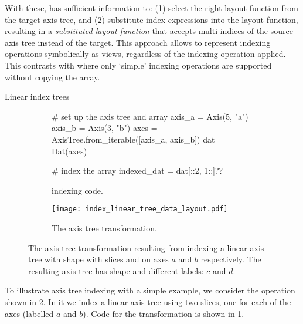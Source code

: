 \documentclass[thesis]{subfiles}
\begin{document}
With these,  has sufficient information to:
(1) select the right layout function from the target axis tree, and
(2) substitute index expressions into the layout function, resulting in a \emph{substituted layout function} that accepts multi-indices of the source axis tree instead of the target.
This approach allows  to represent indexing operations symbolically as views, regardless of the indexing operation applied.
This contrasts with \numpy where only `simple' indexing operations are supported without copying the array.

\begin{example}{Linear index trees} \label{example:linear_index_tree}

\begin{figure}
  \centering
  \begin{subfigure}{.9\textwidth}
    \begin{pyalg2}
      # set up the axis tree and array
      axis_a = Axis(5, "a")
      axis_b = Axis(3, "b")
      axes = AxisTree.from_iterable([axis_a, axis_b])
      dat = Dat(axes)

      # index the array
      indexed_dat = dat[::2, 1::]?\label{code:index_linear_apply}?
    \end{pyalg2}

    \caption{ indexing code.}
    \label{fig:index_linear_code}
  \end{subfigure}

  \vspace{1em}

  \begin{subfigure}{\textwidth}
    \centering
    \texttt{[image: index\_linear\_tree\_data\_layout.pdf]}
    \caption{
      The axis tree transformation.
    }
    \label{fig:index_linear_transform}
  \end{subfigure}

  \caption{
    The axis tree transformation resulting from indexing a linear axis tree with shape  with slices \pycode{[::2]} and \pycode{[1::]} on axes $a$ and $b$ respectively.
    The resulting axis tree has shape  and different labels: $c$ and $d$.
  }
  \label{fig:index_linear}
\end{figure}

To illustrate axis tree indexing with a simple example, we consider the operation shown in \cref{fig:index_linear_transform}.
In it we index a linear axis tree using two slices, one for each of the axes (labelled $a$ and $b$).
Code for the transformation is shown in \cref{fig:index_linear_code}.


\end{example}
\end{document}
